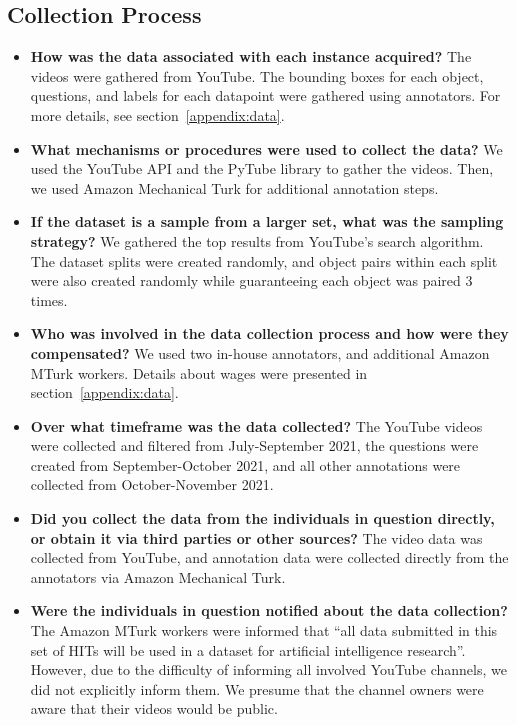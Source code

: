 \documentclass[runningheads]{llncs}
\begin{document}
\subsection{Collection Process} 
\begin{itemize}
    \item \textbf{How was the data associated with each instance acquired?} The videos were gathered from YouTube. The bounding boxes for each object, questions, and labels for each datapoint were gathered using annotators. For more details, see section~\ref{appendix:data}.

\item \textbf{What mechanisms or procedures were used to collect the data?} We used the YouTube API and the PyTube library to gather the videos. Then, we used Amazon Mechanical Turk for additional annotation steps. 

\item \textbf{If the dataset is a sample from a larger set, what was the sampling
strategy?} We gathered the top results from YouTube's search algorithm. The dataset splits were created randomly, and object pairs within each split were also created randomly while guaranteeing each object was paired 3 times. 

\item \textbf{Who was involved in the data collection process and how were they compensated?} We used two in-house annotators, and additional Amazon MTurk workers. Details about wages were presented in section~\ref{appendix:data}. 

\item \textbf{Over what timeframe was the data collected?} The YouTube videos were collected and filtered from July-September 2021, the questions were created from September-October 2021, and all other annotations were collected from October-November 2021. 

\item \textbf{Did you collect the data from the individuals in question directly,
or obtain it via third parties or other sources?} The video data was collected from YouTube, and annotation data were collected directly from the annotators via Amazon Mechanical Turk.

\item \textbf{Were the individuals in question notified about the data collection?} The Amazon MTurk workers were informed that ``all data submitted in this set of HITs will be used in a dataset for artificial intelligence research''. However, due to the difficulty of informing all involved YouTube channels, we did not explicitly inform them. We presume that the channel owners were aware that their videos would be public. 


\end{itemize}
\end{document}
